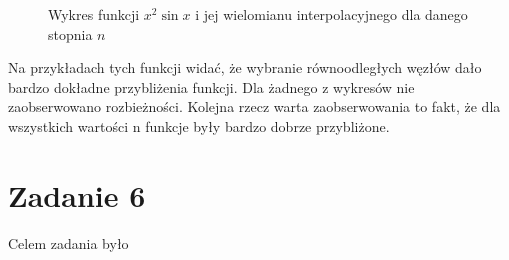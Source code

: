\documentclass[]{article}
\begin{document}
\begin{figure}[!htbp]
	\centering
	 \hfill
	 \hfill
	 \hfill
	\caption*{Wykres funkcji $x^2\sin{x}$ i jej wielomianu interpolacyjnego dla danego stopnia $n$}
\end{figure}	

Na przykładach tych funkcji widać, że wybranie równoodległych węzłów dało bardzo dokładne przybliżenia funkcji. Dla żadnego z wykresów nie zaobserwowano rozbieżności. Kolejna rzecz warta zaobserwowania to fakt, że dla wszystkich wartości n funkcje były bardzo dobrze przybliżone.



	\clearpage
	
	\section*{Zadanie 6}
	
	Celem zadania było 
\end{document}
